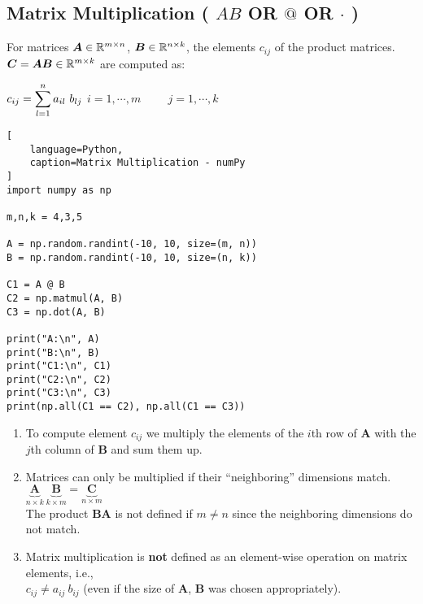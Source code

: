 \subsection{Matrix Multiplication ( $AB$ OR $@$ OR $\cdot$ ) \cite{mfml/book/mml/Deisenroth-Faisal-Ong}}

For matrices $\bm{A} \in \mathbb{R}^{m\times n}$, $\bm{B} \in \mathbb{R}^{n\times k}$, the elements $c_{ij}$ of the product matrices. $\bm{C} = \bm{AB} \in \mathbb{R}^{m\times k}$ are computed as:

\vspace{0.5cm}
\hfill
$
    c_{ij} = \dsum_{l=1}^n a_{il}\ b_{lj}
$
\hfill
$
    i = 1,\cdots,m
    \hspace{1cm}
    j = 1,\cdots,k
$
\hfill \cite{mfml/book/mml/Deisenroth-Faisal-Ong}





\begin{lstlisting}[
    language=Python,
    caption=Matrix Multiplication - numPy
]
import numpy as np

m,n,k = 4,3,5

A = np.random.randint(-10, 10, size=(m, n))
B = np.random.randint(-10, 10, size=(n, k))

C1 = A @ B
C2 = np.matmul(A, B)
C3 = np.dot(A, B)

print("A:\n", A)
print("B:\n", B)
print("C1:\n", C1)
print("C2:\n", C2)
print("C3:\n", C3)
print(np.all(C1 == C2), np.all(C1 == C3))
\end{lstlisting}




\vspace{0.5cm}

\begin{enumerate}
    \item To compute element $c_{ij}$ we multiply the elements of the $i$th row of $\bm{A}$ with the $j$th column of $\bm{B}$ and sum them up.
    \hfill \cite{mfml/book/mml/Deisenroth-Faisal-Ong}

    \item Matrices can only be multiplied if their “neighboring” dimensions match.
    \hfill \cite{mfml/book/mml/Deisenroth-Faisal-Ong}
    \\
    \hfill
    $
        \underset{n\times k}{\underbrace{\bm{A}}}\
        \underset{k\times m}{\underbrace{\bm{B}}}
        =
        \underset{n\times m}{\underbrace{\bm{C}}}
    $
    \hfill \cite{mfml/book/mml/Deisenroth-Faisal-Ong}
    \\
    The product $\bm{BA}$ is not defined if $m \neq n$ since the neighboring dimensions do not match.

    \item Matrix multiplication is \textbf{not} defined as an element-wise operation on matrix elements, i.e.,
    \\
    $c_{ij} \neq a_{ij}\ b_{ij}$ (even if the size of $\bm{A}$, $\bm{B}$ was chosen appropriately).
    \hfill \cite{mfml/book/mml/Deisenroth-Faisal-Ong}
\end{enumerate}


